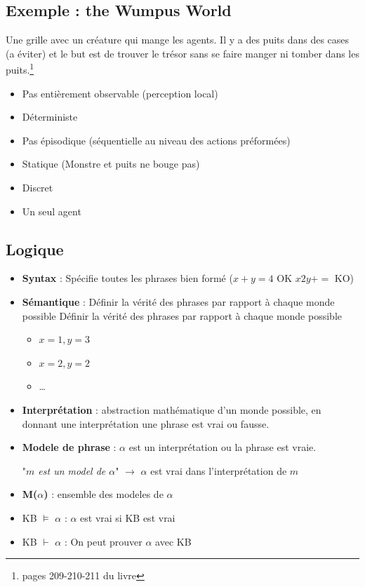 \documentclass[12pt]{article}
\begin{document}
	\subsection{Exemple : the Wumpus World}
	
		Une grille avec un créature qui mange les agents. Il y a des puits dans des cases (a éviter) et le but est de trouver le trésor sans se faire manger ni tomber dans les puits.\footnote{pages 209-210-211 du livre}
		\begin{itemize}
			\item Pas entièrement observable (perception local)
			\item Déterministe
			\item Pas épisodique (séquentielle au niveau des actions préformées)
			\item Statique (Monstre et puits ne bouge pas)
			\item Discret
			\item Un seul agent
		\end{itemize}
		
	\subsection{Logique}
		\begin{itemize}
			\item \textbf{Syntax} : Spécifie toutes les phrases bien formé ($x+y=4$ OK $x2y+=$ KO)
			\item \textbf{Sémantique} : Définir la vérité des phrases par rapport à chaque monde possible Définir la vérité des phrases par rapport à chaque monde possible
			\begin{itemize}
				\item $x=1, y=3$
				\item $x=2, y=2$
				\item \dots
			\end{itemize}
			\item \textbf{Interprétation} : abstraction mathématique d'un monde possible, en donnant une interprétation une phrase est vrai ou fausse.
			\item \textbf{Modele de phrase} : $\alpha$ est un interprétation ou la phrase est vraie.
			
			"\textit{$m$ est un model de $\alpha$}" $\rightarrow$ $\alpha$ est vrai dans l'interprétation de $m$
			\item \textbf{M($\alpha$)} : ensemble des modeles de $\alpha$
			\item KB $\models$ $\alpha$ : $\alpha$ est vrai si KB est vrai
			\item KB $\vdash$ $\alpha$ : On peut prouver $\alpha$ avec KB 

		\end{itemize}
		
\end{document}
